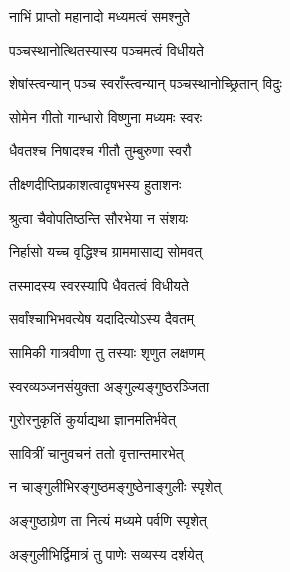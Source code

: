 {नाभिं प्राप्तो महानादो मध्यमत्वं समश्नुते}

{पञ्चस्थानोत्थितस्यास्य पञ्चमत्वं विधीयते}

{शेषांस्त्वन्यान् पञ्च स्वराँस्त्वन्यान् पञ्चस्थानोच्छ्रितान् विदुः}

{सोमेन गीतो गान्धारो विष्णुना मध्यमः स्वरः}

{धैवतश्च निषादश्च गीतौ तुम्बुरुणा स्वरौ}

{तीक्ष्णदीप्तिप्रकाशत्वादृषभस्य हुताशनः}

{श्रुत्वा चैवोपतिष्ठन्ति सौरभेया न संशयः}

{निर्हासो यच्च वृद्धिश्च ग्राममासाद्य सोमवत्}

{तस्मादस्य स्वरस्यापि धैवतत्वं विधीयते}

{सर्वांश्चाभिभवत्येष यदादित्योऽस्य दैवतम्}

\closesub

\resetShloka

{सामिकी गात्रवीणा तु तस्याः शृणुत लक्षणम्}

{स्वरव्यञ्जनसंयुक्ता अङ्गुल्यङ्गुष्ठरञ्जिता}

{गुरोरनुकृतिं कुर्याद्यथा ज्ञानमतिर्भवेत्}

{सावित्रीं चानुवचनं ततो वृत्तान्तमारभेत्}

{न चाङ्गुलीभिरङ्गुष्ठमङ्गुष्ठेनाङ्गुलीः स्पृशेत्}

{अङ्गुष्ठाग्रेण ता नित्यं मध्यमे पर्वणि स्पृशेत्}

{अङ्गुलीभिर्द्विमात्रं तु पाणेः सव्यस्य दर्शयेत्}

